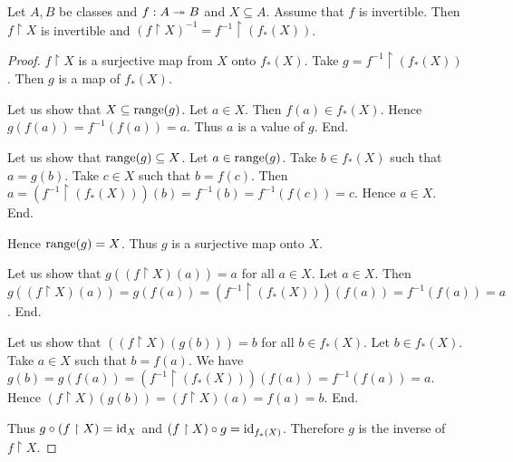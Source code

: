 \documentclass[10pt]{article}
\begin{document}
  \begin{forthel}
    \begin{proposition}[id=FOUNDATIONS_09_6374884963778560,printid]
      Let $A, B$ be classes and $f : A \twoheadrightarrow B$ and $X \subseteq A$.
      Assume that $f$ is invertible.
      Then $f \restriction X$ is invertible and $(f\restriction X)^{-1} = f^{-1} \restriction (f_{*}(X))$.
    \end{proposition}
    \begin{proof}
      $f \restriction X$ is a surjective map from $X$ onto $f_{*}(X)$.
      Take $g = f^{-1} \restriction (f_{*}(X))$.
      Then $g$ is a map of $f_{*}(X)$.

      Let us show that $X \subseteq \textrm{range}(g)$.
        Let $a \in X$.
        Then $f(a) \in f_{*}(X)$.
        Hence $g(f(a)) = f^{-1}(f(a)) = a$.
        Thus $a$ is a value of $g$.
      End.

      Let us show that $\textrm{range}(g) \subseteq X$.
        Let $a \in \textrm{range}(g)$.
        Take $b \in f_{*}(X)$ such that $a = g(b)$.
        Take $c \in X$ such that $b = f(c)$.
        Then $a
          = (f^{-1} \restriction (f_{*}(X)))(b)
          = f^{-1}(b)
          = f^{-1}(f(c))
          = c$.
        Hence $a \in X$.
      End.

      Hence $\textrm{range}(g) = X$.
      Thus $g$ is a surjective map onto $X$.

      Let us show that $g((f \restriction X)(a)) = a$ for all $a \in X$.
        Let $a \in X$.
        Then $g((f \restriction X)(a))
          = g(f(a))
          = (f^{-1} \restriction (f_{*}(X)))(f(a))
          = f^{-1}(f(a))
          = a$.
      End.

      Let us show that $((f \restriction X)(g(b))) = b$ for all $b \in f_{*}(X)$.
        Let $b \in f_{*}(X)$.
        Take $a \in X$ such that $b = f(a)$.
        We have $g(b)
          = g(f(a))
          = (f^{-1} \restriction (f_{*}(X)))(f(a))
          = f^{-1}(f(a))
          = a$.
        Hence $(f \restriction X)(g(b))
          = (f \restriction X)(a)
          = f(a)
          = b$.
      End.

      Thus $g \circ (f \restriction X) = \textrm{id}_{X}$ and $(f \restriction X) \circ g = \textrm{id}_{f_{*}(X)}$.
      Therefore $g$ is the inverse of $f \restriction X$.
    \end{proof}
  \end{forthel}
\end{document}
